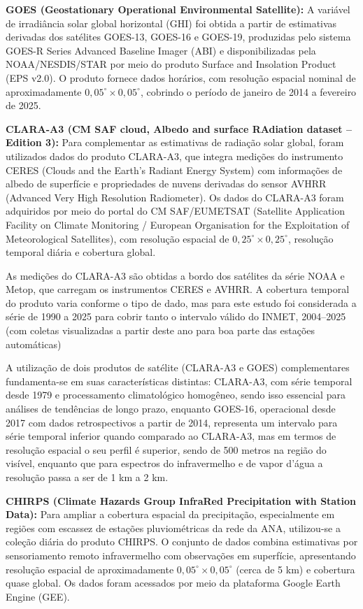     \textbf{GOES (Geostationary Operational Environmental Satellite):} A variável de irradiância solar global horizontal (GHI) foi obtida a partir de estimativas derivadas dos satélites GOES-13, GOES-16 e GOES-19, produzidas pelo sistema GOES-R Series Advanced Baseline Imager (ABI) e disponibilizadas pela NOAA/NESDIS/STAR por meio do produto Surface and Insolation Product (EPS v2.0). O produto fornece dados horários, com resolução espacial nominal de aproximadamente $0{,}05^\circ \times 0{,}05^\circ$, cobrindo o período de janeiro de 2014 a fevereiro de 2025.
    
    \textbf{CLARA-A3 (CM SAF cloud, Albedo and surface RAdiation dataset – Edition 3):} Para complementar as estimativas de radiação solar global, foram utilizados dados do produto CLARA-A3, que integra medições do instrumento CERES (Clouds and the Earth’s Radiant Energy System) com informações de albedo de superfície e propriedades de nuvens derivadas do sensor AVHRR (Advanced Very High Resolution Radiometer). Os dados do CLARA-A3 foram adquiridos por meio do portal do CM SAF/EUMETSAT (Satellite Application Facility on Climate Monitoring / European Organisation for the Exploitation of Meteorological Satellites), com resolução espacial de $0{,}25^\circ \times 0{,}25^\circ$, resolução temporal diária e cobertura global.
    
    As medições do CLARA-A3 são obtidas a bordo dos satélites da série NOAA e Metop, que carregam os instrumentos CERES e AVHRR. A cobertura temporal do produto varia conforme o tipo de dado, mas para este estudo foi considerada a série de 1990 a 2025 para cobrir tanto o intervalo válido do INMET, 2004--2025 (com coletas visualizadas a partir deste ano para boa parte das estações automáticas)

    A utilização de dois produtos de satélite (CLARA-A3 e GOES) complementares fundamenta-se em suas características distintas: CLARA-A3, com série temporal desde 1979 e processamento climatológico homogêneo, sendo isso essencial para análises de tendências de longo prazo, enquanto GOES-16, operacional desde 2017 com dados  retrospectivos a partir de 2014, representa um intervalo para série temporal inferior quando comparado ao CLARA-A3, mas em termos de resolução espacial o seu perfil é superior, sendo de 500 metros na região do visível, enquanto que para espectros do infravermelho e de vapor d'água a resolução passa a ser de 1 km a 2 km.
    
    \textbf{CHIRPS (Climate Hazards Group InfraRed Precipitation with Station Data):} Para ampliar a cobertura espacial da precipitação, especialmente em regiões com escassez de estações pluviométricas da rede da ANA, utilizou-se a coleção diária do produto CHIRPS. O conjunto de dados combina estimativas por sensoriamento remoto infravermelho com observações em superfície, apresentando resolução espacial de aproximadamente $0{,}05^\circ \times 0{,}05^\circ$ (cerca de 5 km) e cobertura quase global. Os dados foram acessados por meio da plataforma Google Earth Engine (GEE).
    
